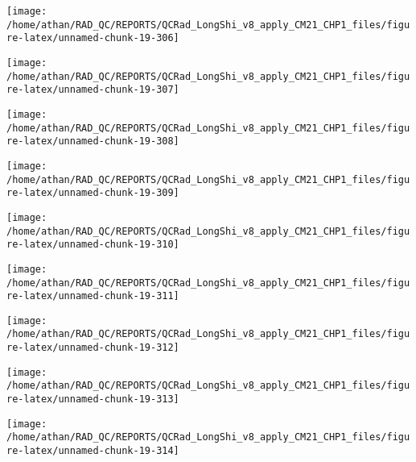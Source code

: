 \documentclass[
  10pt,
  a4paper,oneside]{article}
\begin{document}
\begin{center}\texttt{[image: /home/athan/RAD\_QC/REPORTS/QCRad\_LongShi\_v8\_apply\_CM21\_CHP1\_files/figure-latex/unnamed-chunk-19-306]} \end{center}

\begin{center}\texttt{[image: /home/athan/RAD\_QC/REPORTS/QCRad\_LongShi\_v8\_apply\_CM21\_CHP1\_files/figure-latex/unnamed-chunk-19-307]} \end{center}

\begin{center}\texttt{[image: /home/athan/RAD\_QC/REPORTS/QCRad\_LongShi\_v8\_apply\_CM21\_CHP1\_files/figure-latex/unnamed-chunk-19-308]} \end{center}

\begin{center}\texttt{[image: /home/athan/RAD\_QC/REPORTS/QCRad\_LongShi\_v8\_apply\_CM21\_CHP1\_files/figure-latex/unnamed-chunk-19-309]} \end{center}

\begin{center}\texttt{[image: /home/athan/RAD\_QC/REPORTS/QCRad\_LongShi\_v8\_apply\_CM21\_CHP1\_files/figure-latex/unnamed-chunk-19-310]} \end{center}

\begin{center}\texttt{[image: /home/athan/RAD\_QC/REPORTS/QCRad\_LongShi\_v8\_apply\_CM21\_CHP1\_files/figure-latex/unnamed-chunk-19-311]} \end{center}

\begin{center}\texttt{[image: /home/athan/RAD\_QC/REPORTS/QCRad\_LongShi\_v8\_apply\_CM21\_CHP1\_files/figure-latex/unnamed-chunk-19-312]} \end{center}

\begin{center}\texttt{[image: /home/athan/RAD\_QC/REPORTS/QCRad\_LongShi\_v8\_apply\_CM21\_CHP1\_files/figure-latex/unnamed-chunk-19-313]} \end{center}

\begin{center}\texttt{[image: /home/athan/RAD\_QC/REPORTS/QCRad\_LongShi\_v8\_apply\_CM21\_CHP1\_files/figure-latex/unnamed-chunk-19-314]} \end{center}
\end{document}
